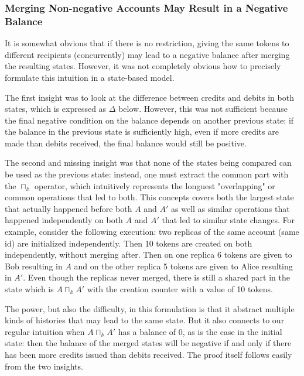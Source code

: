 \documentclass[9pt]{article}   	%
\begin{document}
\subsubsection{Merging Non-negative Accounts May Result in a Negative Balance}
\label{sec:proofs:merge-concurrent-accounts}

It is somewhat obvious that if there is no restriction, giving the same tokens to different recipients (concurrently) may lead to a negative balance after merging the resulting states. However, it was not completely obvious how to precisely formulate this intuition in a state-based model. 

The first insight was to look at the difference between credits and debits in both states, which is expressed as $\Delta$ below. However, this was not sufficient because the final negative condition on the balance depends on another previous state: if the balance in the previous state is sufficiently high, even if more credits are made than debits received, the final balance would still be positive. 

The second and missing insight was that none of the states being compared can be used as the previous state: instead, one must extract the common part with the $\sqcap_\mathds{A}$ operator, which intuitively represents the longuest "overlapping" or common operations that led to both. This concepts covers both the largest state that actually happened before both $A$ and $A'$ as well as similar operations that happened independently on both $A$ and $A'$ that led to similar state changes. For example, consider the following execution: two replicas of the same account (same id) are initialized independently. Then 10 tokens are created on both independently, without merging after. Then on one replica 6 tokens are given to Bob resulting in $A$ and on the other replica 5 tokens are given to Alice resulting in $A'$. Even though the replicas never merged, there is still a shared part in the state which is $A \sqcap_\mathds{A} A'$ with the creation counter with a value of 10 tokens.

The power, but also the difficulty, in this formulation is that it abstract multiple kinds of histories that may lead to the same state. But it also connects to our regular intuition when $A \sqcap_\mathds{A} A'$ has a balance of 0, as is the case in the initial state: then the balance of the merged states will be negative if and only if there has been more credits issued than debits received. The proof itself follows easily from the two insights.
\end{document}
